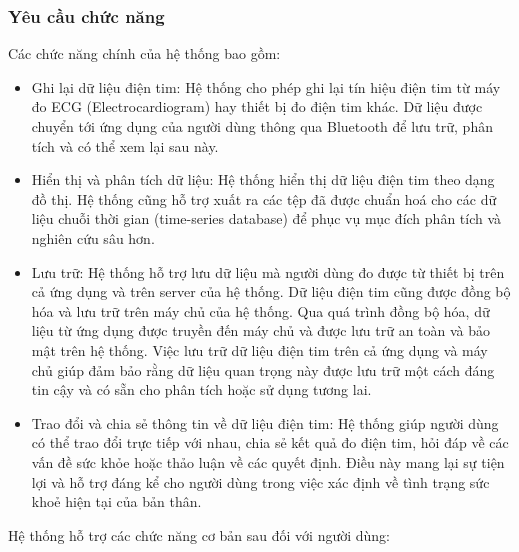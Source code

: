 \subsubsection{Yêu cầu chức năng}
Các chức năng chính của hệ thống bao gồm: 
\begin{adjustwidth}{1.5em}{}
  \begin{itemize}
      \item Ghi lại dữ liệu điện tim: Hệ thống cho phép ghi lại tín hiệu điện tim từ máy đo ECG (Electrocardiogram) hay thiết bị đo điện tim khác. Dữ liệu được chuyển tới ứng dụng của người dùng thông qua Bluetooth để lưu trữ, phân tích và có thể xem lại sau này.
  
      \item Hiển thị và phân tích dữ liệu: Hệ thống hiển thị dữ liệu điện tim theo dạng đồ thị. Hệ thống cũng hỗ trợ xuất ra các tệp đã được chuẩn hoá cho các dữ liệu chuỗi thời gian (time-series database) để phục vụ mục đích phân tích và nghiên cứu sâu hơn.
  
      \item Lưu trữ: Hệ thống hỗ trợ lưu dữ liệu mà người dùng đo được từ thiết bị trên cả ứng dụng và trên server của hệ thống. Dữ liệu điện tim cũng được đồng bộ hóa và lưu trữ trên máy chủ của hệ thống. Qua quá trình đồng bộ hóa, dữ liệu từ ứng dụng được truyền đến máy chủ và được lưu trữ an toàn và bảo mật trên hệ thống. Việc lưu trữ dữ liệu điện tim trên cả ứng dụng và máy chủ giúp đảm bảo rằng dữ liệu quan trọng này được lưu trữ một cách đáng tin cậy và có sẵn cho phân tích hoặc sử dụng tương lai.
  
      \item Trao đổi và chia sẻ thông tin về dữ liệu điện tim: Hệ thống giúp người dùng có thể trao đổi trực tiếp với nhau, chia sẻ kết quả đo điện tim, hỏi đáp về các vấn đề sức khỏe hoặc thảo luận về các quyết định. Điều này mang lại sự tiện lợi và hỗ trợ đáng kể cho người dùng trong việc xác định về tình trạng sức khoẻ hiện tại của bản thân.
  \end{itemize}
  \end{adjustwidth}
  
  

  
  
Hệ thống hỗ trợ các chức năng cơ bản sau đối với người dùng:

